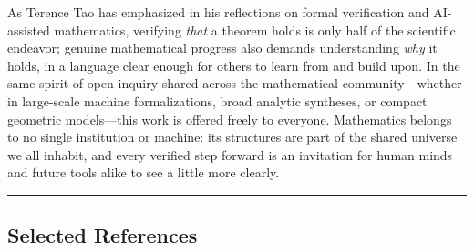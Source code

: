 \documentclass[
  11pt,
]{article}
\begin{document}
As Terence Tao has emphasized in his reflections on formal verification
and AI-assisted mathematics, verifying \emph{that} a theorem holds is
only half of the scientific endeavor; genuine mathematical progress also
demands understanding \emph{why} it holds, in a language clear enough
for others to learn from and build upon. In the same spirit of open
inquiry shared across the mathematical community---whether in
large-scale machine formalizations, broad analytic syntheses, or compact
geometric models---this work is offered freely to everyone. Mathematics
belongs to no single institution or machine: its structures are part of
the shared universe we all inhabit, and every verified step forward is
an invitation for human minds and future tools alike to see a little
more clearly.

\begin{center}\rule{0.5\linewidth}{0.5pt}\end{center}

\subsection{Selected References}\label{selected-references}
\end{document}
